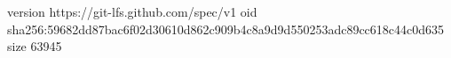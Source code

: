 version https://git-lfs.github.com/spec/v1
oid sha256:59682dd87bac6f02d30610d862c909b4c8a9d9d550253adc89cc618c44c0d635
size 63945
